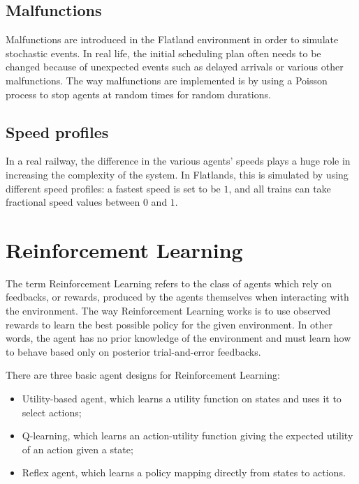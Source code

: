 \documentclass[a4paper, 12pt]{article}
\numberwithin{equation}{section}
\begin{document}
\subsection[Malfunctions]{Malfunctions \cite{malfunctions}}

Malfunctions are introduced in the Flatland environment in order to simulate stochastic events. In real life, the initial scheduling plan often needs to be changed because of unexpected events such as delayed arrivals or various other malfunctions. The way malfunctions are implemented is by using a Poisson process to stop agents at random times for random durations.

\subsection[Speed profiles]{Speed profiles \cite{speeds}}

In a real railway, the difference in the various agents' speeds plays a huge role in increasing the complexity of the system. In Flatlands, this is simulated by using different speed profiles: a fastest speed is set to be $1$, and all trains can take fractional speed values between $0$ and $1$.












\section[Reinforcement Learning]{Reinforcement Learning \cite{reinforcement-learning}}\label{ch:reinforcement-learning}

The term Reinforcement Learning refers to the class of agents which rely on feedbacks, or rewards, produced by the agents themselves when interacting with the environment. The way Reinforcement Learning works is to use observed rewards to learn the best possible policy for the given environment. In other words, the agent has no prior knowledge of the environment and must learn how to behave based only on posterior trial-and-error feedbacks.

There are three basic agent designs for Reinforcement Learning:
\begin{itemize}
	\item Utility-based agent, which learns a utility function on states and uses it to select actions;
	\item Q-learning, which learns an action-utility function giving the expected utility of an action given a state;
	\item Reflex agent, which learns a policy mapping directly from states to actions.
\end{itemize}
\end{document}
